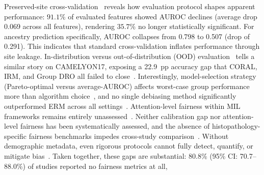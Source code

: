 Preserved-site cross-validation~\citep{howard2021site} reveals how evaluation protocol shapes apparent performance: $91.1$\%
of evaluated features showed AUROC declines (average drop 0.069 across all features),
rendering $35.7$\% no longer statistically significant. For ancestry prediction specifically, AUROC collapses from 0.798 to 0.507 (drop of 0.291). This indicates that
standard cross-validation inflates performance through site leakage. In-distribution
versus out-of-distribution (OOD) evaluation~\citep{koh2021wilds} tells a similar story on CAMELYON17, exposing a 22.9~pp accuracy
gap that CORAL, IRM, and Group DRO all failed to close~\citep{koh2021wilds}. Interestingly, model-selection strategy (Pareto-optimal
versus average-AUROC) affects worst-case group performance more than
algorithm choice~\citep{zong2023medfair}, and no single debiasing method
significantly outperformed ERM across all settings~\citep{zong2023medfair}.
Attention-level fairness within MIL frameworks remains entirely
unassessed~\citep{ling2024agent, campanella2019clinical}. Neither calibration gap nor attention-level fairness has been systematically assessed, and the
absence of histopathology-specific fairness benchmarks impedes
cross-study comparison~\citep{montezuma2025unbiased, chen2023algorithmic}.
Without demographic metadata, even rigorous protocols cannot fully
detect, quantify, or mitigate bias~\citep{norori2021addressing}.
Taken together, these gaps are substantial: 80.8\% (95\% CI: 70.7--88.0\%) of studies reported no fairness metrics at all,

